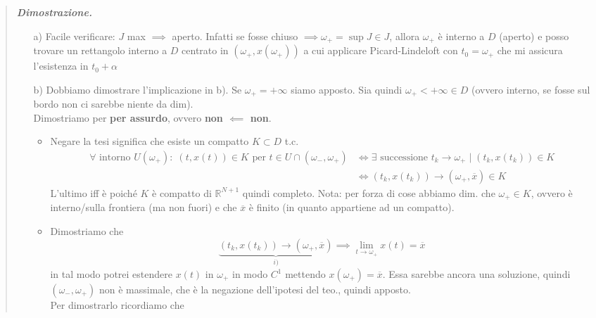 \documentclass[a4paper,10pt]{article}
\newcommand{\re}{\mathbb{R}} %
\theoremstyle{indentdefinition}
\theoremstyle{indenttheorem}
\theoremstyle{myremark}
\theoremstyle{indentgeneral}
\newenvironment{dimo}{\begin{quote}\textit{\textbf{Dimostrazione.}}}{\end{quote}} %
\begin{document}
\begin{dimo}
    \begin{itemize}
        \item[a)] Facile verificare: $J$ max $\implies$ aperto. Infatti se fosse chiuso $\implies\omega_+=\sup J\in J$, allora $\omega_+$ è interno a $D$ (aperto) e posso trovare un rettangolo  interno a $D$ centrato in $(\omega_+,x(\omega_+))$ a cui applicare Picard-Lindeloft con $t_0=\omega_+$ che mi assicura l'esistenza in $t_0+\alpha$
        \item[b)] Dobbiamo dimostrare l'implicazione in b). Se $\omega_+=+\infty$ siamo apposto. Sia quindi $\omega_+<+\infty \in D$ (ovvero interno, se fosse sul bordo non ci sarebbe niente da dim).
        \\Dimostriamo per \textbf{per assurdo}, ovvero \textbf{non $\impliedby$ non}. \\
        \begin{itemize}
            \item Negare la tesi significa che esiste un compatto $K\subset D$ t.c. 
            \begin{align*}
            \forall \text{ intorno }U(\omega_+): \; (t,x(t))\in K \text{ per } t\in U\cap(\omega_-,\omega_+) &\iff \exists \text{ successione } t_k\to\omega_+ \mid (t_k,x(t_k))\in K \\
            &\iff (t_k,x(t_k))\to(\omega_+,\overline{x})\in K
            \end{align*}
            L'ultimo iff è poiché $K$ è compatto di $\re^{N+1}$ quindi completo. Nota: per forza di cose abbiamo dim. che $\omega_+\in K$, ovvero è interno/sulla frontiera (ma non fuori) e che $\overline{x}$ è finito (in quanto appartiene ad un compatto).
            \item Dimostriamo che 
            $$\underbrace{(t_k,x(t_k))\to(\omega_+,\overline{x})}_{i)}\implies \lim_{t\to\omega_+}x(t)=\overline{x}$$
            in tal modo potrei estendere $x(t)$ in $\omega_+$ in modo $C^1$ mettendo $x(\omega_+)=\overline{x}$. Essa sarebbe ancora una soluzione, quindi $(\omega_-,\omega_+)$ non è massimale, che è la negazione dell'ipotesi del teo., quindi apposto. \\
            Per dimostrarlo ricordiamo che 
   

\end{itemize}
\end{itemize}
\end{dimo}
\end{document}
